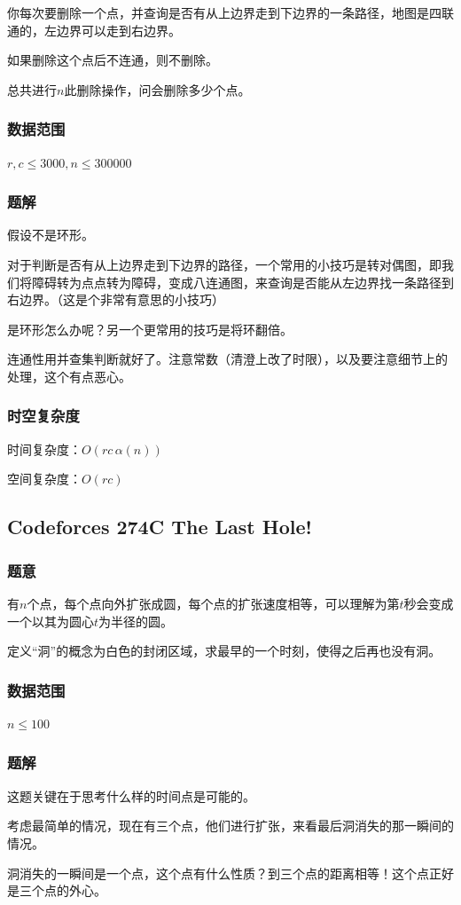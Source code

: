 \documentclass{ctexart}
\begin{document}
你每次要删除一个点，并查询是否有从上边界走到下边界的一条路径，地图是四联通的，左边界可以走到右边界。

如果删除这个点后不连通，则不删除。

总共进行$n$此删除操作，问会删除多少个点。
\subsubsection{数据范围}
$r,c \le 3000,n \le 300000$
\subsubsection{题解}
假设不是环形。

对于判断是否有从上边界走到下边界的路径，一个常用的小技巧是转对偶图，即我们将障碍转为点点转为障碍，变成八连通图，来查询是否能从左边界找一条路径到右边界。（这是个非常有意思的小技巧）

是环形怎么办呢？另一个更常用的技巧是将环翻倍。

连通性用并查集判断就好了。注意常数（清澄上改了时限），以及要注意细节上的处理，这个有点恶心。
\subsubsection{时空复杂度}
时间复杂度：$O(rc\,\alpha(n))$

空间复杂度：$O(rc)$
\subsection{Codeforces 274C The Last Hole!}
\subsubsection{题意}
有$n$个点，每个点向外扩张成圆，每个点的扩张速度相等，可以理解为第$t$秒会变成一个以其为圆心$t$为半径的圆。

定义“洞”的概念为白色的封闭区域，求最早的一个时刻，使得之后再也没有洞。
\subsubsection{数据范围}
$n \le 100$
\subsubsection{题解}
这题关键在于思考什么样的时间点是可能的。

考虑最简单的情况，现在有三个点，他们进行扩张，来看最后洞消失的那一瞬间的情况。

洞消失的一瞬间是一个点，这个点有什么性质？到三个点的距离相等！这个点正好是三个点的外心。
\end{document}
